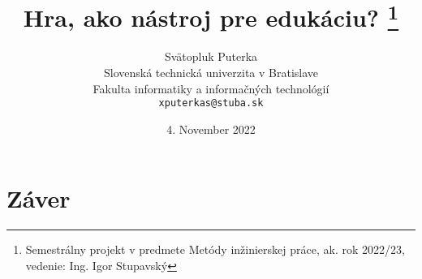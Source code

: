 \documentclass[10pt,twoside,slovak,a4paper]{article}
\date{\small 4. November 2022}
\begin{document}
\begin{titlepage}
	\title{Hra, ako nástroj pre edukáciu?
	\thanks{Semestrálny projekt v predmete Metódy inžinierskej práce, ak. rok 2022/23, vedenie: Ing. Igor Stupavský}} 
	\author{Svätopluk Puterka\\[2pt]
		{\small Slovenská technická univerzita v Bratislave}\\
		{\small Fakulta informatiky a informačných technológií}\\
		{\small \texttt{xputerkas@stuba.sk}}
	}
\end{titlepage}

{\maketitle }






\section{Záver} \label{zaver}





 

\end{document}

